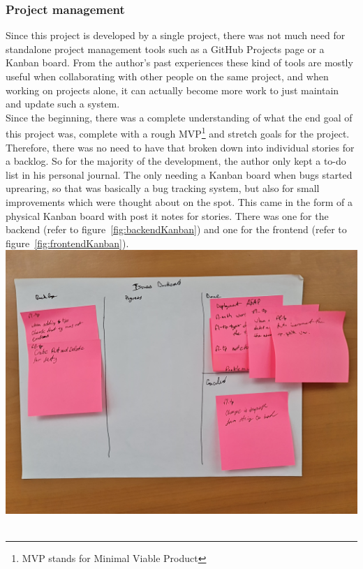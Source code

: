 \documentclass{article}
\newcommand{\vspaceconst}{-2ex}
\begin{document}
\begin{multicols}{2}
\subsubsection{Project management}
\vspace{\vspaceconst}

Since this project is developed by a single project, there was not much need for standalone project management tools such as a GitHub Projects page or a Kanban board. From the author's past experiences these kind of tools are mostly useful when collaborating with other people on the same project, and when working on projects alone, it can actually become more work to just maintain and update such a system.\\
Since the beginning, there was a complete understanding of what the end goal of this project was, complete with a rough MVP\footnote{MVP stands for Minimal Viable Product} and stretch goals for the project. Therefore, there was no need to have that broken down into individual stories for a backlog. So for the majority of the development, the author only kept a to-do list in his personal journal. The only needing a Kanban board when bugs started uprearing, so that was basically a bug tracking system, but also for small improvements which were thought about on the spot. This came in the form of a physical Kanban board with post it notes for stories. There was one for the backend (refer to figure~\ref{fig:backendKanban}) and one for the frontend (refer to figure~\ref{fig:frontendKanban}).\\

\begingroup
\centering
\includegraphics[width=0.9\linewidth]{./appendix/assets/img/backendBacklog.jpg}
~\label{fig:backendKanban}
\endgroup


\end{multicols}
\end{document}
